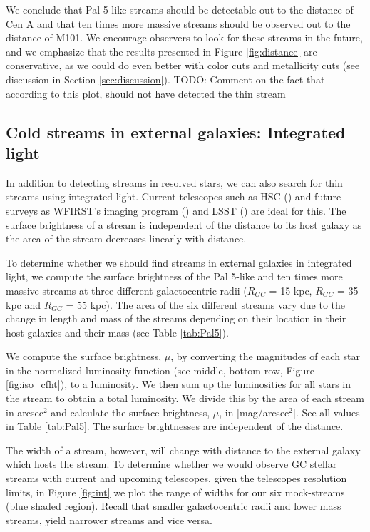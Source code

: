 \documentclass[twocolumn]{aastex62}
\newcommand{\todo}[1]{{\color{red} TODO: #1}}
\begin{document}
We conclude that Pal 5-like streams should be detectable out to the distance of Cen A and that ten times more massive streams should be observed out to the distance of M101. We encourage observers to look for these streams in the future, and we emphasize that the results presented in Figure \ref{fig:distance} are conservative, as we could do even better with color cuts and metallicity cuts (see discussion in Section \ref{sec:discussion}). \todo{Comment on the fact that according to this plot, \citet{abraham18} should not have detected the thin stream}

\subsection{Cold streams in external galaxies: Integrated light}
\label{sec:integrated}
In addition to detecting streams in resolved stars, we can also search for thin streams using integrated light. Current telescopes such as HSC (\citealt{miyazaki12}) and future surveys as WFIRST's imaging program (\citealt{spergel13}) and LSST  (\citealt{ivezi08}) are ideal for this. The surface brightness of a stream is independent of the distance to its host galaxy as the area of the stream decreases linearly with distance. 

To determine whether we should find streams in external galaxies in integrated light, we compute the surface brightness of the Pal 5-like and ten times more massive streams at three different galactocentric radii ($R_{GC}$ = 15  kpc, $R_{GC}$ = 35 kpc and $R_{GC}$ = 55 kpc). The area of the six different streams vary due to the change in length and mass of the streams depending on their location in their host galaxies and their mass (see Table \ref{tab:Pal5}).

We compute the surface brightness, $\mu$, by converting the magnitudes of each star in the normalized luminosity function (see middle, bottom row, Figure \ref{fig:iso_cfht}), to a luminosity. We then sum up the luminosities for all stars in the stream to obtain a total luminosity. We divide this by the area of each stream in arcsec$^2$ and calculate the surface brightness, $\mu$, in [mag/arcsec$^2$]. See all values in Table \ref{tab:Pal5}. The surface brightnesses are independent of the distance.  

The width of a stream, however, will change with distance to the external galaxy which hosts the stream. To determine whether we would observe GC stellar streams with current and upcoming telescopes, given the telescopes resolution limits, in Figure \ref{fig:int} we plot the range of widths for our six mock-streams (blue shaded region). Recall that smaller galactocentric radii and lower mass streams, yield narrower streams and vice versa. %
\end{document}
